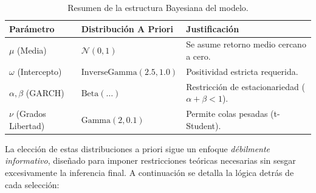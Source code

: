 \begin{table}[h]
    \centering
    \begin{tabular}{llp{6cm}}
        \toprule
        \textbf{Parámetro} & \textbf{Distribución A Priori} & \textbf{Justificación} \\
        \midrule
        $\mu$ (Media) & $\mathcal{N}(0, 1)$ & Se asume retorno medio cercano a cero. \\
        $\omega$ (Intercepto) & $\text{InverseGamma}(2.5, 1.0)$ & Positividad estricta requerida. \\
        $\alpha, \beta$ (GARCH) & $\text{Beta}(\dots)$ & Restricción de estacionariedad ($\alpha + \beta < 1$). \\
        $\nu$ (Grados Libertad) & $\text{Gamma}(2, 0.1)$ & Permite colas pesadas (t-Student). \\
        \bottomrule
    \end{tabular}
    \caption{Resumen de la estructura Bayesiana del modelo.}
    \label{tab:priors}
\end{table}

\noindent La elección de estas distribuciones a priori sigue un enfoque \textit{débilmente informativo}, diseñado para imponer restricciones teóricas necesarias sin sesgar excesivamente la inferencia final. A continuación se detalla la lógica detrás de cada selección:


